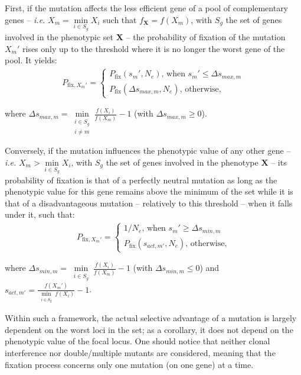 \documentclass[11pt,onecolumn]{article}
\newcommand{\vect}[1]{\boldsymbol{#1}}
\begin{document}
 First, if the mutation affects the less efficient gene of a pool of complementary genes -- \textit{i.e.} $X_{m}=\min \limits_{i \in S_g} X_i$ such that $f_{\vect{X}}=f(X_m)$, with $S_g$ the set of genes involved in the phenotypic set $\vect{X}$ -- the probability of fixation of the mutation $X_m'$ rises only up to the threshold where it is no longer the worst gene of the pool. It yields:
 \begin{align}
     P_{\text{fix},X_{m}'} = \left\{
    \begin{array}{ll}
        P_{\text{fix}}(s_m',N_e)\text{, when $s_m'$} \leq \Delta s_{max,m} \\
        P_{\text{fix}}(\Delta s_{max,m},N_e)\text{, otherwise,}
    \end{array}
\right.
\label{eq:Pfix_compepi1}
 \end{align}
 
where $\Delta s_{max,m}=\min \limits_{\substack{i \in S_g \\ i\neq m}} \frac{f(X_i)}{f(X_m)} - 1$ (with $\Delta s_{max,m} \geq 0$). 

Conversely, if the mutation influences the phenotypic value of any other gene -- \textit{i.e.} $X_{m}>\min \limits_{i \in S_g} X_i$, with $S_g$ the set of genes involved in the phenotype $\vect{X}$ -- its probability of fixation is that of a perfectly neutral mutation as long as the phenotypic value for this gene remains above the minimum of the set while it is that of a disadvantageous mutation -- relatively to this threshold -- when it falls under it, such that:
 \begin{align}
     P_{\text{fix},X_{m}'} = \left\{
    \begin{array}{ll}
        1/N_e\text{, when $s_m'$} \geq \Delta s_{min,m} \\
        P_{\text{fix}}(s_{act,m'},N_e)\text{, otherwise,}
    \end{array}
\right.
\label{eq:Pfix_compepi2}
 \end{align}
 
where $\Delta s_{min,m}=\min \limits_{\substack{i \in S_g}} \frac{f(X_i)}{f(X_m)} - 1$ (with $\Delta s_{min,m} \leq 0$) and $s_{act,m'}=\frac{f(X_m')}{\min \limits_{\substack{i \in S_g}} f(X_i)}-1$. 

Within such a framework, the actual selective advantage of a mutation is largely dependent on the worst loci in the set; as a corollary, it does not depend on the phenotypic value of the focal locus. One should notice that neither clonal interference nor double/multiple mutants are considered, meaning that the fixation process concerns only one mutation (on one gene) at a time.
\end{document}

